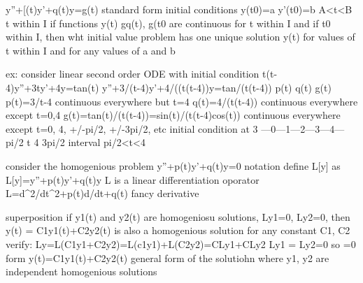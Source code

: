\documentclass{article}
\begin{document}
y''+[(t)y'+q(t)y=g(t) standard form
initial conditions y(t0)=a y'(t0)=b
A<t<B t within I
if functions y(t) gq(t), g(t0 are continuous for t within I
and if t0 within I, then wht initial value problem has one unique solution y(t) for values of t within I and for any values of a and b


ex: consider linear second order ODE with initial condition
t(t-4)y''+3ty'+4y=tan(t)
y''+3/(t-4)y'+4/((t(t-4))y=tan/(t(t-4))
     p(t)        q(t)             g(t)
p(t)=3/t-4 continuous everywhere but t=4
q(t)=4/(t(t-4)) continuous everywhere except t=0,4
g(t)=tan(t)/(t(t-4))=sin(t)/(t(t-4)cos(t)) continuous everywhere except t=0, 4, +/-pi/2, +/-3pi/2, etc
initial condition at 3
---0---1---2---3---4---
          pi/2     t     4   3pi/2
interval pi/2<t<4


consider the homogenious problem y''+p(t)y'+q(t)y=0
notation
define L[y] as L[y]=y''+p(t)y'+q(t)y
L is a linear differentiation oporator
L=d^2/dt^2+p(t)d/dt+q(t)
fancy derivative

superposition
if y1(t) and y2(t) are homogeniosu solutions, Ly1=0, Ly2=0, then y(t) = C1y1(t)+C2y2(t)
is also a homogenious solution for any constant C1, C2
verify: Ly=L(C1y1+C2y2)=L(c1y1)+L(C2y2)=CLy1+CLy2
Ly1 = Ly2=0
so =0
form
y(t)=C1y1(t)+C2y2(t)   general form of the solutiohn
where y1, y2 are independent homogenious solutions






\fi
\end{document}

